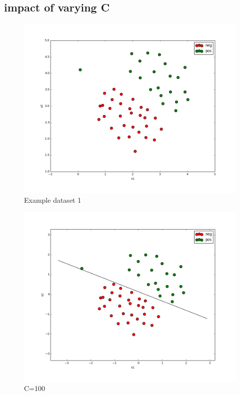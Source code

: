 \documentclass[pdftex,11pt]{article}
\begin{document}
\subsection{impact of varying C}
\begin{figure}[H]
  \caption{Example dataset 1}
  \centering
    \includegraphics[scale=0.5]{oridata.png}
\end{figure}

\begin{figure}[H]
  \caption{C=100}
  \centering
    \includegraphics[scale=0.5]{c100.png}
\end{figure}
\end{document}
